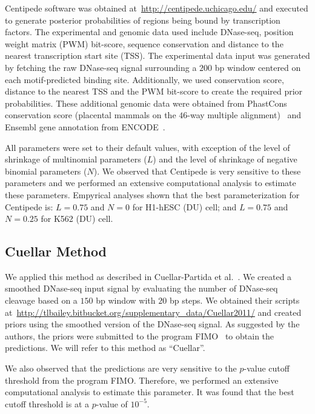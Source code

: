 Centipede software was obtained at~\url{http://centipede.uchicago.edu/} and executed to generate posterior probabilities of regions being bound by transcription factors. The experimental and genomic data used include DNase-seq, position weight matrix (PWM) bit-score, sequence conservation and distance to the nearest transcription start site (TSS). The experimental data input was generated by fetching the raw DNase-seq signal surrounding a $200$ bp window centered on each motif-predicted binding site. Additionally, we used conservation score, distance to the nearest TSS and the PWM bit-score to create the required prior probabilities. These additional genomic data were obtained from PhastCons conservation score (placental mammals on the $46$-way multiple alignment)~\cite{siepel2005} and Ensembl gene annotation from ENCODE~\cite{hubbard2002}.

All parameters were set to their default values, with exception of the level of shrinkage of multinomial parameters ($L$) and the level of shrinkage of negative binomial parameters ($N$). We observed that Centipede is very sensitive to these parameters and we performed an extensive computational analysis to estimate these parameters. Empyrical analyses shown that the best parameterization for Centipede is: $L=0.75$ and $N=0$ for H1-hESC (DU) cell; and $L=0.75$ and $N=0.25$ for K562 (DU) cell.

\subsection{Cuellar Method}
\label{sec:cuellar}

We applied this method as described in Cuellar-Partida et al.~\cite{cuellar2012}. We created a smoothed DNase-seq input signal by evaluating the number of DNase-seq cleavage based on a $150$ bp window with $20$ bp steps. We obtained their scripts at~\url{http://tlbailey.bitbucket.org/supplementary_data/Cuellar2011/} and created priors using the smoothed version of the DNase-seq signal. As suggested by the authors, the priors were submitted to the program FIMO~\cite{grant2011} to obtain the predictions. We will refer to this method as ``Cuellar''.

We also observed that the predictions are very sensitive to the $p$-value cutoff threshold from the program FIMO. Therefore, we performed an extensive computational analysis to estimate this parameter. It was found that the best cutoff threshold is at a $p$-value of $10^{-5}$.

